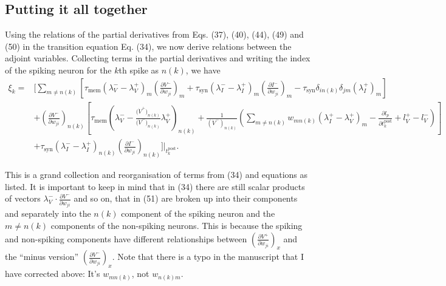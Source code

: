 \documentclass[a4paper]{article}
\newcommand{\blue}[1]{{\color{blue}#1}}
\begin{document}
    \subsection{Putting it all together}
  \blue{
    Using the relations of the partial derivatives from Eqs. (37), (40), (44), (49) and (50) in the transition equation
Eq. (34), we now derive relations between the adjoint variables. Collecting terms in the partial derivatives and
writing the index of the spiking neuron for the $k$th spike as $n(k)$, we
have
\begin{align}
  \xi_k = &\Bigg[ \sum_{m \neq n(k)} \left[ \tau_{\text{mem}}
      (\lambda^-_V - \lambda^+_V)_m \left(\frac{\partial V^-}{\partial
        w_{ji}}\right)_m
      +\tau_{\text{syn}} (\lambda^-_I - \lambda^+_I )_m
      \left(\frac{\partial I^-}{\partial w_{ji}}\right)_m
      - \tau_{\text{syn}} \delta_{in(k)} \delta_{jm} (\lambda^+_I)_m
      \right] \nonumber \\
    &+\left(\frac{\partial V^-}{\partial w_{ji}}\right)_{n(k)} \left[
      \tau_{\text{mem}} \left( \lambda^-_V -
      \frac{\big(\dot{V}^+\big)_{n(k)}}{\big(\dot{V}^-\big)_{n(k)}}
      \lambda_V^+ \right)_{n(k)}
      +\frac{1}{(\dot{V}^-)_{n(k)}} \left(\sum_{m \neq n(k)} w_{mn(k)}
      (\lambda_I^+- \lambda_V^+)_m - \frac{\partial l_p}{\partial
        t_k^{\text{post}}} + l_V^+ - l_V^- \right)\right] \nonumber \\
    &+ \tau_{\text{syn}} (\lambda^-_I - \lambda^+_I)_{n(k)}
    \left(\frac{\partial I^-}{\partial w_{ji}}\right)_{n(k)} \Bigg]
  \Bigg|_{t_k^{\text{post}}} . \tag{51}
\end{align} 
  }

This is a grand collection and reorganisation of terms from
\blue{(34)} and equations as listed. It is important to keep in mind
that in \blue{(34)} there are still scalar products of vectors
$\lambda_V^- \cdot \frac{\partial V^-}{\partial w_{ji}}$ and so on,
that in \blue{(51)} are broken up into their components and separately
into the $n(k)$ component of the spiking neuron and the $m \neq n(k)$
components of the non-spiking neurons. This is because the spiking and
non-spiking components have different relationships between
$\left(\frac{\partial V^+}{\partial w_{ji}}\right)_x$ and the ``minus
version'' $\left(\frac{\partial V^-}{\partial w_{ji}}\right)_x$. Note
that there is a typo in the manuscript that I have corrected above:
It's $w_{mn(k)}$, not $w_{n(k)m}$.
\end{document}

